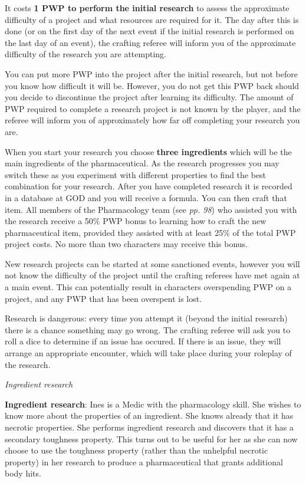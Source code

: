 \documentclass{scrbook}
\begin{document}
It costs \textbf{1 PWP to perform the initial research} to assess the approximate difficulty of a project and what resources are required for it. The day after this is done (or on the first day of the next event if the initial research is performed on the last day of an event), the crafting referee will inform you of the approximate difficulty of the research you are attempting.

You can put more PWP into the project after the initial research, but not before you know how difficult it will be. However, you do not get this PWP back should you decide to discontinue the project after learning its difficulty. The amount of PWP required to complete a research project is not known by the player, and the referee will inform you of approximately how far off completing your research you are.

When you start your research you choose \textbf{three ingredients} which will be the main ingredients of the pharmaceutical. As the research progresses you may switch these as you experiment with different properties to find the best combination for your research. After you have completed research it is recorded in a database at GOD and you will receive a formula. You can then craft that item. All members of the Pharmacology team (see \textit{pp. 98}) who assisted you with the research receive a 50\% PWP bonus to learning how to craft the new pharmaceutical item, provided they assisted with at least 25\% of the total PWP project costs. No more than two characters may receive this bonus.

New research projects can be started at some sanctioned events, however you will not know the difficulty of the project until the crafting referees have met again at a main event. This can potentially result in characters overspending PWP on a project, and any PWP that has been overspent is lost.

Research is dangerous: every time you attempt it (beyond the initial research) there is a chance something may go wrong. The crafting referee will ask you to roll a dice to determine if an issue has occured. If there is an issue, they will arrange an appropriate encounter, which will take place during your roleplay of the research.

\textit{Ingredient research}

\textbf{Ingredient research}: Ines is a Medic with the pharmacology skill. She wishes to know more about the properties of an ingredient. She knows already that it has necrotic properties. She performs ingredient research and discovers that it has a secondary toughness property. This turns out to be useful for her as she can now choose to use the toughness property (rather than the unhelpful necrotic property) in her research to produce a pharmaceutical that grants additional body hits.
\end{document}
